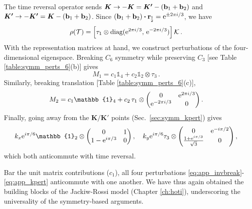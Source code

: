 %
The time reversal operator sends $\boldsymbol{K}  \rightarrow -\boldsymbol{K} = \boldsymbol{K'} - ( \vb{b}_1 + \vb{b}_2)$ and $\boldsymbol{K'}  \rightarrow -\boldsymbol{K'} = \boldsymbol{K} - (\vb{b}_1 + \vb{b}_2)$. Since $(\vb{b}_1 + \vb{b}_2) \vdot  \vb{r}_{_{2}^{1}} = \e^{\pm 2 \pi i / 3}$, we have
\begin{equation}
\rho(\mathcal{T}) = \left[\tau_1 \otimes \text{diag} (  {\rm e}^{2 \pi i /3} , \, {\rm e}^{-2 \pi i /3} ) \right] \mathcal{K} \,.
\end{equation}
%
With the representation matrices at hand, we construct perturbations of the four-dimensional eigenspace. Breaking $C_6$ symmetry while preserving $C_3$ [see Table \ref{table:symm_perts_6}(b)] gives
\begin{equation} \label{eq:app_invbreak}
M_1 = c_1 \mathbb{1}_4 + c_2 \mathbb{1}_2 \otimes \tau_3 \,.
\end{equation}
%
Similarly, breaking translation [Table \ref{table:symm_perts_6}(c)],
\begin{equation}
M_2 = c_1 \mathbb{1}_4 + c_2 \, \tau_1 \otimes \mqty(0 & \e^{2 \pi i /3} \\ \e^{-2\pi i / 3} & 0) \,.
\end{equation}
Finally, going away from the $\boldsymbol{K} / \boldsymbol{K'}$ points (Sec.~\ref{sec:symm_kpert}) gives
\begin{equation} \label{eq:app_kpert}
k_x \e^{i \pi / 6} \mathbb{1}_2 \otimes \mqty(0 & 1 \\ 1 - \e^{i \pi / 3}  & 0) \,, \quad k_y \e^{i \pi / 6} \tau_3 \otimes \mqty(0 & \e^{-i \pi/2} \\ \frac{1+\e^{i \pi /3}}{\sqrt{3}} & 0) \,,
\end{equation}
which both anticommute with time reversal. 

Bar the unit matrix contributions ($c_1$), all four perturbations \eqref{eq:app_invbreak}-\eqref{eq:app_kpert} anticommute with one another. We have thus again obtained the building blocks of the Jackiw-Rossi model (Chapter \ref{ch:hoti}), underscoring the universality of the symmetry-based arguments. 